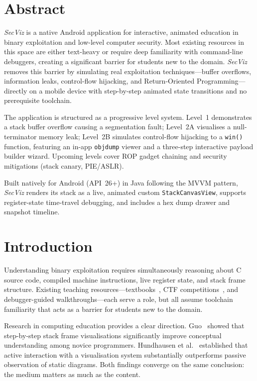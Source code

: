 \documentclass[12pt,a4paper]{article}
\newcommand{\SV}{\textit{SecViz}}
\begin{document}
\tableofcontents
\newpage

\section{Abstract}

\SV{} is a native Android application for interactive, animated education in
binary exploitation and low-level computer security. Most existing resources in
this space are either text-heavy or require deep familiarity with command-line
debuggers, creating a significant barrier for students new to the domain.
\SV{} removes this barrier by simulating real exploitation techniques---buffer
overflows, information leaks, control-flow hijacking, and Return-Oriented
Programming---directly on a mobile device with step-by-step animated state
transitions and no prerequisite toolchain.

The application is structured as a progressive level system. Level~1 demonstrates
a stack buffer overflow causing a segmentation fault; Level~2A visualises a
null-terminator memory leak; Level~2B simulates control-flow hijacking to a
\texttt{win()} function, featuring an in-app \texttt{objdump} viewer and a
three-step interactive payload builder wizard. Upcoming levels cover ROP gadget
chaining and security mitigations (stack canary, PIE/ASLR).

Built natively for Android (API~26+) in Java following the MVVM pattern, \SV{}
renders its stack as a live, animated custom \texttt{StackCanvasView}, supports
register-state time-travel debugging, and includes a hex dump drawer and snapshot
timeline.

\section{Introduction}

Understanding binary exploitation requires simultaneously reasoning about C source
code, compiled machine instructions, live register state, and stack frame structure.
Existing teaching resources---textbooks~\cite{erickson2008}, CTF
competitions~\cite{chapmanburket2016}, and debugger-guided walkthroughs---each
serve a role, but all assume toolchain familiarity that acts as a barrier for
students new to the domain.

Research in computing education provides a clear direction. Guo~\cite{guo2013}
showed that step-by-step stack frame visualisations significantly improve
conceptual understanding among novice programmers. Hundhausen et al.\
\cite{hundhausen2002} established that active interaction with a visualisation
system substantially outperforms passive observation of static diagrams.
Both findings converge on the same conclusion: the medium matters as much as
the content.
\end{document}
